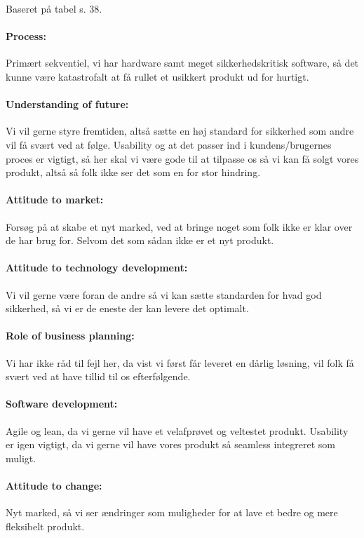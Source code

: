 Baseret på tabel s. 38.
\paragraph{Process:} Primært sekventiel, vi har hardware samt meget sikkerhedskritisk software, så det kunne være katastrofalt at få rullet et usikkert produkt ud for hurtigt.

\paragraph{Understanding of future:} Vi vil gerne styre fremtiden, altså sætte en høj standard for sikkerhed som andre vil få svært ved at følge.
Usability og at det passer ind i kundens/brugernes proces er vigtigt, så her skal vi være gode til at tilpasse os så vi kan få solgt vores produkt, altså så folk ikke ser det som en for stor hindring.

\paragraph{Attitude to market:} Forsøg på at skabe et nyt marked, ved at bringe noget som folk ikke er klar over de har brug for.
Selvom det som sådan ikke er et nyt produkt.

\paragraph{Attitude to technology development:} Vi vil gerne være foran de andre så vi kan sætte standarden for hvad god sikkerhed, så vi er de eneste der kan levere det optimalt.

\paragraph{Role of business planning:} Vi har ikke råd til fejl her, da vist vi først får leveret en dårlig løsning, vil folk få svært ved at have tillid til os efterfølgende.

\paragraph{Software development:} Agile og lean, da vi gerne vil have et velafprøvet og veltestet produkt.
Usability er igen vigtigt, da vi gerne vil have vores produkt så seamless integreret som muligt.

\paragraph{Attitude to change:} Nyt marked, så vi ser ændringer som muligheder for at lave et bedre og mere fleksibelt produkt.

